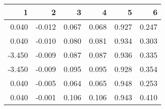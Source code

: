 \begin{table}[ht]
\centering
\begin{tabular}{rrrrrr}
  \hline
1 & 2 & 3 & 4 & 5 & 6 \\ 
  \hline
0.040 & -0.012 & 0.067 & 0.068 & 0.927 & 0.247 \\ 
  0.040 & -0.010 & 0.080 & 0.081 & 0.934 & 0.303 \\ 
  -3.450 & -0.009 & 0.087 & 0.087 & 0.936 & 0.335 \\ 
  -3.450 & -0.009 & 0.095 & 0.095 & 0.928 & 0.354 \\ 
  0.040 & -0.005 & 0.064 & 0.065 & 0.948 & 0.253 \\ 
  0.040 & -0.001 & 0.106 & 0.106 & 0.943 & 0.410 \\ 
   \hline
\end{tabular}
\end{table}
